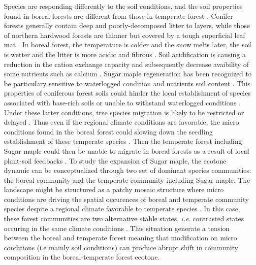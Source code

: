 Species are responding differently to the soil conditions, and the soil
properties found in boreal forests are different from those in temperate forest
\cite{Lafleur2010,Barras1998,Goldblum2010,Demers1998}. Conifer forests generally
contain deep and poorly-decomposed litter to layers, while those of northern
hardwood forests are thinner but covered by a tough superficial leaf mat
\cite{Barras1998}. In boreal forest, the temperature is colder and the snow
melts later, the soil is wetter and the litter is more acidic and fibrous
\cite{Lafleur2010,Goldblum2010}. Soil acidification is causing a reduction in
the cation exchange capacity and subsequently decrease avaibility of some
nutrients such as calcium \cite{Moore2008}. Sugar maple regeneration has been
recognized to be particulary sensitive to waterlogged condition and nutrients
soil content \cite{Moore2008,Lafleur2010,Cleavitt2011}. This properties of
coniferous forest soils could hinder the local establishment of species
associated with base-rich soils or unable to withstand waterlogged conditions
\cite{Lafleur2010}. Under these latter conditions, tree species migration is
likely to be restricted or delayed \cite{Lafleur2010}. Thus even if the regional
climate conditions are favorable, the micro conditions found in the boreal
forest could slowing down the seedling establishment of these temperate species
\cite{Kellman2004,Moore2008,Barras1998}. Then the temperate forest including
Sugar maple could then be unable to migrate in boreal forests as a result of
local plant-soil feedbacks \cite{McCarthyNeumann2012}. To study the expansion of
Sugar maple, the ecotone dynamic can be conceptualized through two set of
dominant species communities: the boreal community and the temperate community
including Sugar maple. The landscape might be structured as a patchy mosaic
structure where micro conditions are driving the spatial occurences of boreal
and temperate community species despite a regional climate favorable to
temperate species \cite{Goldblum2010,Fisichelli2013}. In this case, these forest
communities are two alternative stable states, \textit{i.e.} contrasted states
occuring in the same climate conditions \cite{scheffer2009critical}. This situation generate a tension between the
boreal and temperate forest meaning that modification on micro conditions (i.e
mainly soil conditions) can produce abrupt shift in community composition in the
boreal-temperate forest ecotone.\\


